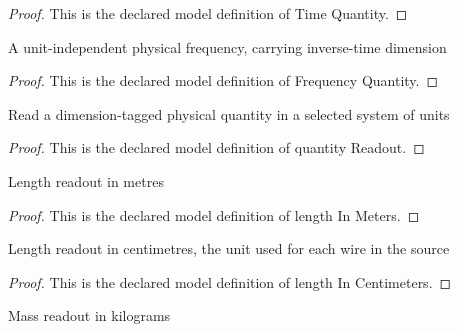\begin{proof}
  This is the declared model definition of Time Quantity.
\end{proof}
\begin{definition}
  \label{def:physics:phyx-mini-0172:phyxminiproblems-problemphyxmini0172-frequencyquantity}
  A unit-independent physical frequency, carrying inverse-time dimension
\end{definition}
\begin{proof}
  This is the declared model definition of Frequency Quantity.
\end{proof}
\begin{definition}
  \label{def:physics:phyx-mini-0172:phyxminiproblems-problemphyxmini0172-quantityreadout}
  Read a dimension-tagged physical quantity in a selected system of units
\end{definition}
\begin{proof}
  This is the declared model definition of quantity Readout.
\end{proof}
\begin{definition}
  \label{def:physics:phyx-mini-0172:phyxminiproblems-problemphyxmini0172-lengthinmeters}
  Length readout in metres
\end{definition}
\begin{proof}
  This is the declared model definition of length In Meters.
\end{proof}
\begin{definition}
  \label{def:physics:phyx-mini-0172:phyxminiproblems-problemphyxmini0172-lengthincentimeters}
  Length readout in centimetres, the unit used for each wire in the source
\end{definition}
\begin{proof}
  This is the declared model definition of length In Centimeters.
\end{proof}
\begin{definition}
  \label{def:physics:phyx-mini-0172:phyxminiproblems-problemphyxmini0172-massinkilograms}
  Mass readout in kilograms
\end{definition}
